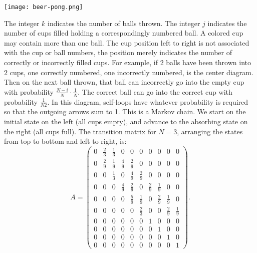 \documentclass[12pt]{article}
\begin{document}
\begin{solution}
\begin{enumerate}[label=(\alph*)]
        \texttt{[image: beer-pong.png]}

        The integer \( k \) indicates the number of balls thrown.  The
        integer \( j \) indicates the number of cups filled holding a
        correspondingly numbered ball.  A colored cup may contain more
        than one ball.  The cup position left to right is not associated
        with the cup or ball numbers, the position merely indicates the
        number of correctly or incorrectly filled cups. For example, if \(
        2 \) balls have been thrown into \( 2 \) cups, one correctly
        numbered, one incorrectly numbered, is the center diagram.  Then
        on the next ball thrown, that ball can incorrectly go into the
        empty cup with probability \( \frac{N-i}{N} \cdot \frac{1}{N} \).
        The correct ball can go into the correct cup with probability \(
        \frac{1}{N2} \). In this diagram, self-loops have whatever
        probability is required so that the outgoing arrows sum to 1.
        This is a Markov chain.  We start on the initial state on the
        left (all cups empty), and advance to the absorbing state on the
        right (all cups full).  The transition matrix for \( N=3 \),
        arranging the states from top to bottom and left to right, is:
        \[
            A =
            \begin{pmatrix}
                0 & \frac{2}{3} & \frac{1}{3} & 0 & 0 & 0 & 0 & 0 & 0 &
                0\\
                0 & \frac{2}{9} & \frac{1}{9} & \frac{4}{9} & \frac{2}{9}
                & 0 & 0 & 0 & 0 & 0\\
                0 & 0 & \frac{1}{3} & 0 & \frac{4}{9} & \frac{2}{9} & 0
                & 0 & 0 & 0\\
                0 & 0 & 0 & \frac{4}{9} & \frac{2}{9} & 0 & \frac{2}{9}
                & \frac{1}{9} & 0 & 0\\
                0 & 0 & 0 & 0 & \frac{5}{9} & \frac{1}{9} & 0 & \frac{2}
                {9} & \frac{1}{9} & 0\\
                0 & 0 & 0 & 0 & 0 & \frac{2}{3} & 0 & 0 & \frac{2}{9} &
                \frac{1}{9}\\
                0 & 0 & 0 & 0 & 0 & 0 & 1 & 0 & 0 & 0\\
                0 & 0 & 0 & 0 & 0 & 0 & 0 & 1 & 0 & 0\\
                0 & 0 & 0 & 0 & 0 & 0 & 0 & 0 & 1 & 0\\
                0 & 0 & 0 & 0 & 0 & 0 & 0 & 0 & 0 & 1
            \end{pmatrix}
            .
        \]


\end{enumerate}
\end{solution}
\end{document}
